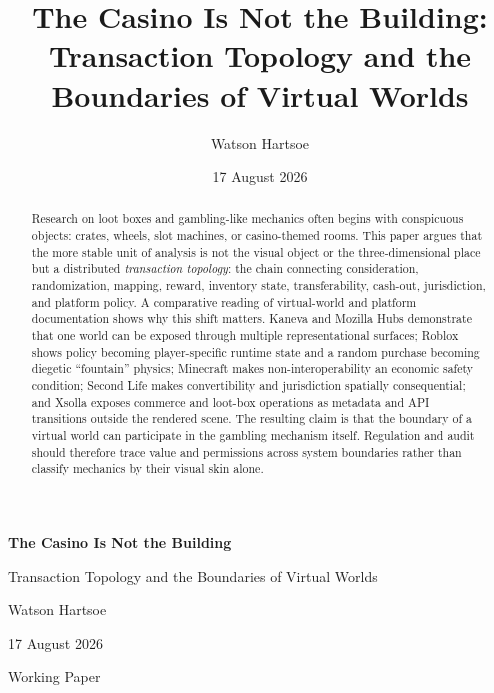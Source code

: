\documentclass[11pt]{article}
\title{The Casino Is Not the Building:\\Transaction Topology and the Boundaries of Virtual Worlds}
\author{Watson Hartsoe}
\date{17 August 2026}
\newcommand{\aimark}{\tikz[baseline=-0.7ex,scale=.18]{\draw[line width=.55pt,line cap=round] (0,0) circle (.10);\draw[line width=.45pt,line cap=round] (-.055,-.015) .. controls (0,-.07) and (.055,-.07) .. (.075,-.015);\draw[line width=.7pt,line cap=round] (.18,-.14) arc[start angle=-38,end angle=55,radius=.28];\draw[line width=.7pt,line cap=round] (.31,-.25) arc[start angle=-39,end angle=56,radius=.46];\draw[line width=.7pt,line cap=round] (.46,-.37) arc[start angle=-40,end angle=57,radius=.66];}}
\begin{document}
\begin{titlepage}
\centering
\vspace{1.05in}
{\LARGE\bfseries The Casino Is Not the Building\par}
\vspace{0.2in}
{\Large Transaction Topology and the Boundaries of Virtual Worlds\par}
\vfill
{\large Watson Hartsoe\par}
\vspace{0.12in}
{\normalsize 17 August 2026\par}
\vfill
{\footnotesize Working Paper\par}
\end{titlepage}

\begin{abstract}
Research on loot boxes and gambling-like mechanics often begins with conspicuous objects: crates, wheels, slot machines, or casino-themed rooms. This paper argues that the more stable unit of analysis is not the visual object or the three-dimensional place but a distributed \emph{transaction topology}: the chain connecting consideration, randomization, mapping, reward, inventory state, transferability, cash-out, jurisdiction, and platform policy. A comparative reading of virtual-world and platform documentation shows why this shift matters. Kaneva and Mozilla Hubs demonstrate that one world can be exposed through multiple representational surfaces; Roblox shows policy becoming player-specific runtime state and a random purchase becoming diegetic ``fountain'' physics; Minecraft makes non-interoperability an economic safety condition; Second Life makes convertibility and jurisdiction spatially consequential; and Xsolla exposes commerce and loot-box operations as metadata and API transitions outside the rendered scene. The resulting claim is that the boundary of a virtual world can participate in the gambling mechanism itself. Regulation and audit should therefore trace value and permissions across system boundaries rather than classify mechanics by their visual skin alone.
\end{abstract}
\end{document}
